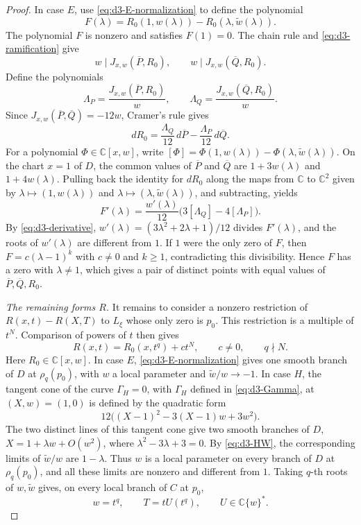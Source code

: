 \documentclass[11pt,letterpaper]{article}
\numberwithin{equation}{section}
\theoremstyle{remark}
\theoremstyle{plain}
\newcommand{\C}{\mathbb{C}}
\begin{document}
\begin{proof}
In case $E$, use \eqref{eq:d3-E-normalization} to define the polynomial
\[
 F(\lambda)=R_0(1,w(\lambda))
             -R_0(\lambda,\widetilde w(\lambda)).
\]
The polynomial $F$ is nonzero and satisfies $F(1)=0$.
The chain rule and \eqref{eq:d3-ramification} give
\[
 w\mid J_{x,w}(\overline P,R_0),\qquad
 w\mid J_{x,w}(\overline Q,R_0).
\]
Define the polynomials
\[
 \Lambda_P=\frac{J_{x,w}(\overline P,R_0)}w,\qquad
 \Lambda_Q=\frac{J_{x,w}(\overline Q,R_0)}w.
\]
Since $J_{x,w}(\overline P,\overline Q)=-12w$, Cramer's rule gives
\[
 dR_0=\frac{\Lambda_Q}{12}\,d\overline P
       -\frac{\Lambda_P}{12}\,d\overline Q.
\]
For a polynomial $\Phi\in\C[x,w]$, write
$[\Phi]=\Phi(1,w(\lambda))
-\Phi(\lambda,\widetilde w(\lambda))$.
On the chart $x=1$ of $D$, the common values of $\overline P$ and
$\overline Q$ are $1+3w(\lambda)$ and $1+4w(\lambda)$.
Pulling back the identity for $dR_0$ along the maps from $\C$ to
$\C^2$ given by $\lambda\mapsto(1,w(\lambda))$ and
$\lambda\mapsto(\lambda,\widetilde w(\lambda))$, and subtracting, yields
\begin{equation}
 F'(\lambda)=\frac{w'(\lambda)}{12}
                 \bigl(3[\Lambda_Q]-4[\Lambda_P]\bigr).
 \label{eq:d3-derivative}
\end{equation}
By \eqref{eq:d3-derivative}, $w'(\lambda)=(3\lambda^2+2\lambda+1)/12$ divides
$F'(\lambda)$, and the roots of $w'(\lambda)$ are different from $1$.
If $1$ were the only zero of $F$, then
$F=c(\lambda-1)^k$ with $c\neq0$ and $k\geq1$, contradicting
this divisibility.  Hence $F$ has a zero with $\lambda\neq1$,
which gives a pair of distinct points with equal values of
$\overline P,\overline Q,R_0$.

\smallskip
\noindent\emph{The remaining forms $R$.}
It remains to consider a nonzero restriction of $R(x,t)-R(X,T)$ to $L_\xi$ whose
only zero is $p_0$.  This restriction is a multiple of $t^N$.
Comparison of powers of $t$ then gives
\[
 R(x,t)=R_0(x,t^q)+ct^N,
 \qquad c\neq0,\qquad q\nmid N.
\]
Here $R_0\in\C[x,w]$.
In case $E$, \eqref{eq:d3-E-normalization} gives one smooth branch
of $D$ at $\rho_q(p_0)$, with $w$ a local parameter and
$\widetilde w/w\to-1$.
In case $H$, the tangent cone of the curve $\Gamma_H=0$, with
$\Gamma_H$ defined in \eqref{eq:d3-Gamma}, at $(X,w)=(1,0)$
is defined by the quadratic form
\[
 12\bigl((X-1)^2-3(X-1)w+3w^2\bigr).
\]
The two distinct lines of this tangent cone give two smooth branches of $D$,
$X=1+\lambda w+O(w^2)$, where $\lambda^2-3\lambda+3=0$.
By \eqref{eq:d3-HW}, the corresponding limits of
$\widetilde w/w$ are $1-\lambda$.
Thus $w$ is a local parameter on every branch of $D$ at $\rho_q(p_0)$,
and all these limits are nonzero and different from $1$.
Taking $q$-th roots of $w,\widetilde w$ gives, on every local branch
of $C$ at $p_0$,
\[
 w=t^q,\qquad T=tU(t^q),\qquad U\in\C\{w\}^*.
\]


\end{proof}
\end{document}
